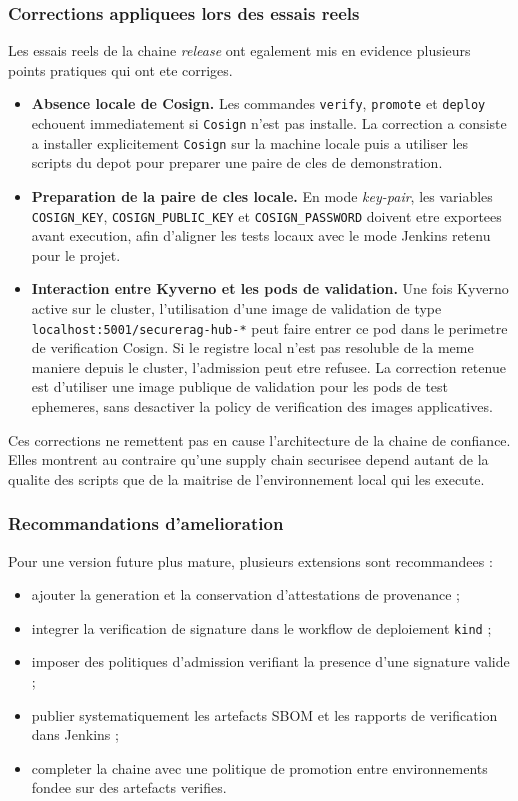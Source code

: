 \subsubsection{Corrections appliquees lors des essais reels}

Les essais reels de la chaine \textit{release} ont egalement mis en evidence plusieurs points pratiques qui ont ete corriges.

\begin{itemize}
  \item \textbf{Absence locale de Cosign.} Les commandes \texttt{verify}, \texttt{promote} et \texttt{deploy} echouent immediatement si \texttt{Cosign} n'est pas installe. La correction a consiste a installer explicitement \texttt{Cosign} sur la machine locale puis a utiliser les scripts du depot pour preparer une paire de cles de demonstration.
  \item \textbf{Preparation de la paire de cles locale.} En mode \textit{key-pair}, les variables \texttt{COSIGN\_KEY}, \texttt{COSIGN\_PUBLIC\_KEY} et \texttt{COSIGN\_PASSWORD} doivent etre exportees avant execution, afin d'aligner les tests locaux avec le mode Jenkins retenu pour le projet.
  \item \textbf{Interaction entre Kyverno et les pods de validation.} Une fois Kyverno active sur le cluster, l'utilisation d'une image de validation de type \texttt{localhost:5001/securerag-hub-*} peut faire entrer ce pod dans le perimetre de verification Cosign. Si le registre local n'est pas resoluble de la meme maniere depuis le cluster, l'admission peut etre refusee. La correction retenue est d'utiliser une image publique de validation pour les pods de test ephemeres, sans desactiver la policy de verification des images applicatives.
\end{itemize}

Ces corrections ne remettent pas en cause l'architecture de la chaine de confiance. Elles montrent au contraire qu'une supply chain securisee depend autant de la qualite des scripts que de la maitrise de l'environnement local qui les execute.

\subsubsection{Recommandations d'amelioration}

Pour une version future plus mature, plusieurs extensions sont recommandees :

\begin{itemize}
  \item ajouter la generation et la conservation d'attestations de provenance ;
  \item integrer la verification de signature dans le workflow de deploiement \texttt{kind} ;
  \item imposer des politiques d'admission verifiant la presence d'une signature valide ;
  \item publier systematiquement les artefacts SBOM et les rapports de verification dans Jenkins ;
  \item completer la chaine avec une politique de promotion entre environnements fondee sur des artefacts verifies.
\end{itemize}

